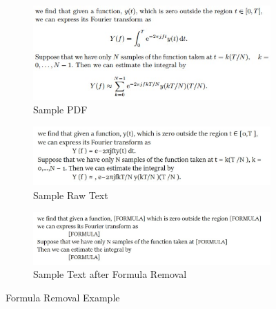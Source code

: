 \begin{figure}[!htb]
\centering
  \begin{subfigure}{.9\textwidth}
  \centering
  \includegraphics[width=\linewidth]{proposed_methodology_and_system_specifications/sample_pdf.jpg}
  \caption{Sample PDF}
  \label{fig:sfig:pdf}
  \end{subfigure}
  
  \begin{subfigure}{.9\textwidth}
  \centering
  \includegraphics[width=\linewidth]{proposed_methodology_and_system_specifications/sample_raw_text.jpg}
  \caption{Sample Raw Text}
  \label{fig:sfig:raw_text}
  \end{subfigure}
  
  \begin{subfigure}{.9\textwidth}
  \centering
  \includegraphics[width=\linewidth]{proposed_methodology_and_system_specifications/sample_normalized_text.jpg}
  \caption{Sample Text after Formula Removal}
  \label{fig:sfig:fm_text}
  \end{subfigure}
 
\caption{Formula Removal Example}
\label{fig:fm_example}
\end{figure}

